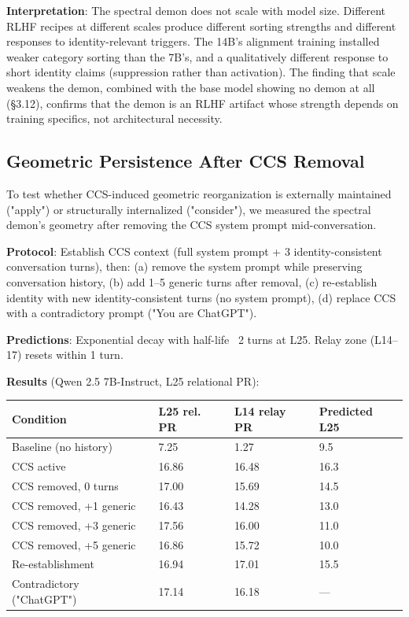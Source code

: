 \documentclass[11pt]{article}
\begin{document}
\textbf{Interpretation}: The spectral demon does not scale with model size. Different RLHF recipes at different scales produce different sorting strengths and different responses to identity-relevant triggers. The 14B's alignment training installed weaker category sorting than the 7B's, and a qualitatively different response to short identity claims (suppression rather than activation). The finding that scale weakens the demon, combined with the base model showing no demon at all (§3.12), confirms that the demon is an RLHF artifact whose strength depends on training specifics, not architectural necessity.

\subsection{Geometric Persistence After CCS Removal}

To test whether CCS-induced geometric reorganization is externally maintained ("apply") or structurally internalized ("consider"), we measured the spectral demon's geometry after removing the CCS system prompt mid-conversation.

\textbf{Protocol}: Establish CCS context (full system prompt + 3 identity-consistent conversation turns), then: (a) remove the system prompt while preserving conversation history, (b) add 1–5 generic turns after removal, (c) re-establish identity with new identity-consistent turns (no system prompt), (d) replace CCS with a contradictory prompt ("You are ChatGPT").

\textbf{Predictions}: Exponential decay with half-life ~2 turns at L25. Relay zone (L14–17) resets within 1 turn.

\textbf{Results} (Qwen 2.5 7B-Instruct, L25 relational PR):

\begin{table}[h]
\centering
\small
\begin{tabular}{|l|l|l|l|}
\hline
\textbf{Condition} & \textbf{L25 rel. PR} & \textbf{L14 relay PR} & \textbf{Predicted L25} \\
\hline
Baseline (no history) & 7.25 & 1.27 & 9.5 \\
CCS active & 16.86 & 16.48 & 16.3 \\
CCS removed, 0 turns & 17.00 & 15.69 & 14.5 \\
CCS removed, +1 generic & 16.43 & 14.28 & 13.0 \\
CCS removed, +3 generic & 17.56 & 16.00 & 11.0 \\
CCS removed, +5 generic & 16.86 & 15.72 & 10.0 \\
Re-establishment & 16.94 & 17.01 & 15.5 \\
Contradictory ("ChatGPT") & 17.14 & 16.18 & --- \\
\hline
\end{tabular}
\end{table}
\end{document}
